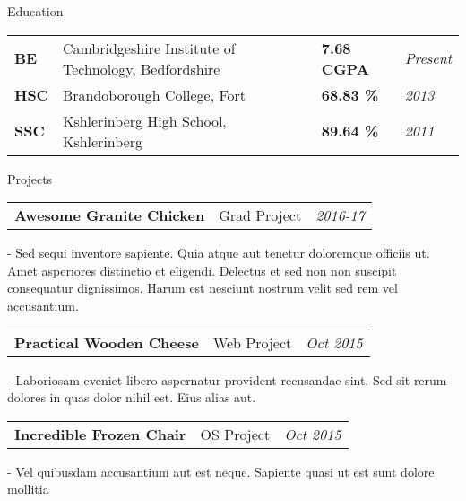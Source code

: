\documentclass{resume}
\begin{document}
    \begin{rSection}{Education}
    
        \begin{tabu} to 1
        
            {\bf BE} & Cambridgeshire Institute of Technology, Bedfordshire & {\bf 7.68 CGPA} & {\em Present}\\ 
            
            {\bf HSC} & Brandoborough College, Fort & {\bf 68.83 \%} & {\em 2013}\\
            
            {\bf SSC} & Kshlerinberg High School, Kshlerinberg & {\bf 89.64 \%} & {\em 2011}\\
        
        \end{tabu}
        
    \end{rSection}
      
    \begin{rSection}{Projects}
      
        \begin{tabu} to 1
            {\bf Awesome Granite Chicken} & Grad Project & {\em 2016-17} \\
        \end{tabu}
        -  Sed sequi inventore sapiente. Quia atque aut tenetur doloremque officiis ut. Amet asperiores distinctio et eligendi. Delectus et sed non non suscipit consequatur dignissimos. Harum est nesciunt nostrum velit sed rem vel accusantium.
        
        \begin{tabu} to 1
            {\bf Practical Wooden Cheese} & Web Project & {\em Oct 2015} \\
        \end{tabu}
        - Laboriosam eveniet libero aspernatur provident recusandae sint. Sed sit rerum dolores in quas dolor nihil est. Eius alias aut.
        
        \begin{tabu} to 1    
            {\bf Incredible Frozen Chair} & OS Project & {\em Oct 2015} \\
        \end{tabu}
        - Vel quibusdam accusantium aut est neque. Sapiente quasi ut est sunt dolore mollitia
    
    \end{rSection}
    
\end{document}
